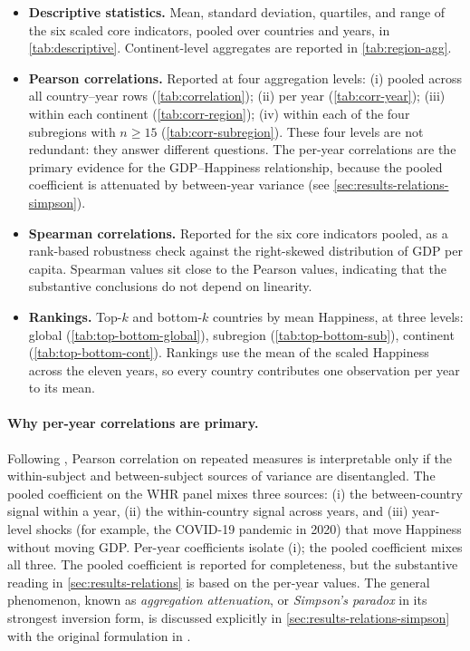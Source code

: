 \begin{itemize}
	\item \textbf{Descriptive statistics.} Mean, standard deviation, quartiles, and range of the six scaled core indicators, pooled over countries and years, in \cref{tab:descriptive}. Continent-level aggregates are reported in \cref{tab:region-agg}.
	\item \textbf{Pearson correlations.} Reported at four aggregation levels: (i) pooled across all country--year rows (\cref{tab:correlation}); (ii) per year (\cref{tab:corr-year}); (iii) within each continent (\cref{tab:corr-region}); (iv) within each of the four subregions with $n \geq 15$ (\cref{tab:corr-subregion}). These four levels are not redundant: they answer different questions. The per-year correlations are the primary evidence for the GDP--Happiness relationship, because the pooled coefficient is attenuated by between-year variance (see \cref{sec:results-relations-simpson}).
	\item \textbf{Spearman correlations.} Reported for the six core indicators pooled, as a rank-based robustness check against the right-skewed distribution of GDP per capita. Spearman values sit close to the Pearson values, indicating that the substantive conclusions do not depend on linearity.
	\item \textbf{Rankings.} Top-\(k\) and bottom-\(k\) countries by mean Happiness, at three levels: global (\cref{tab:top-bottom-global}), subregion (\cref{tab:top-bottom-sub}), continent (\cref{tab:top-bottom-cont}). Rankings use the mean of the scaled Happiness across the eleven years, so every country contributes one observation per year to its mean.
\end{itemize}

\paragraph{Why per-year correlations are primary.} Following \textcite{bland1995}, Pearson correlation on repeated measures is interpretable only if the within-subject and between-subject sources of variance are disentangled. The pooled coefficient on the WHR panel mixes three sources: (i) the between-country signal within a year, (ii) the within-country signal across years, and (iii) year-level shocks (for example, the COVID-19 pandemic in 2020) that move Happiness without moving GDP. Per-year coefficients isolate (i); the pooled coefficient mixes all three. The pooled coefficient is reported for completeness, but the substantive reading in \cref{sec:results-relations} is based on the per-year values. The general phenomenon, known as \emph{aggregation attenuation}, or \emph{Simpson's paradox} in its strongest inversion form, is discussed explicitly in \cref{sec:results-relations-simpson} with the original formulation in \textcite{simpson1951}.
